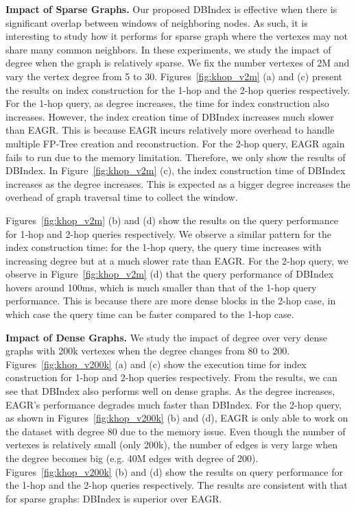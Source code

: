 \textbf{Impact of Sparse Graphs.} Our proposed DBIndex is effective when there is significant overlap between windows of neighboring nodes. As such, it is interesting to study how it performs for sparse graph where the vertexes may not share many common neighbors. In these experiments, 
we study the impact of degree when the graph is relatively sparse.
We fix the number vertexes of 2M and vary the vertex degree from 5 to 30. 
Figures~\ref{fig:khop_v2m} (a) and (c) present the results 
on index construction for the 1-hop and the 2-hop queries respectively. 
For the 1-hop query, as degree increases, the time for index
construction also increases. 
However, the index creation time of DBIndex increases much 
slower than EAGR. This is because EAGR incurs relatively more 
overhead to handle multiple FP-Tree creation and reconstruction. 
For the 2-hop query, EAGR again fails to run due to the memory limitation. %
Therefore, we only show the results of DBIndex. 
In Figure~\ref{fig:khop_v2m} (c), the index construction time of DBIndex increases as the 
degree increases. This is expected as a bigger degree  
increases the overhead of graph traversal time to collect the window. 


Figures~\ref{fig:khop_v2m} (b) and (d)
show the results on the query performance 
for 1-hop and 2-hop queries respectively. 
We observe a similar pattern for the index construction time:
for the 1-hop query, the query time increases with increasing degree
but at a much slower rate than EAGR. For the 2-hop query, we observe in Figure~\ref{fig:khop_v2m} (d) that the
query performance of DBIndex hovers around 100ms, which is much 
smaller than that of the 1-hop query performance. 
This is because there are more dense blocks in the 2-hop case, 
in which case the query time can be faster compared to the 1-hop case. 

\textbf{Impact of Dense Graphs.} We study the 
impact of degree over very dense graphs with 200k vertexes 
when the degree changes from 80 to 200. 
Figures~\ref{fig:khop_v200k} (a) and (c) show
the execution time for index construction 
for 1-hop and 2-hop queries respectively. From the results, 
we can see that DBIndex also performs well on dense graphs. 
As the degree increases, EAGR's performance degrades much faster than DBIndex. For the 2-hop query,
as shown in Figures~\ref{fig:khop_v200k} (b) and (d), EAGR is only able to work on 
the dataset with degree 80 due to the memory issue. 
Even though the number of vertexes is relatively small (only 200k), 
the number of edges is very large when the degree becomes big 
(e.g. 40M edges with degree of 200). 
%
Figures~\ref{fig:khop_v200k} 
(b) and (d) show the results on query performance 
for the 1-hop and the 2-hop queries respectively. 
The results are consistent with that for sparse graphs: DBIndex is superior over EAGR. 

